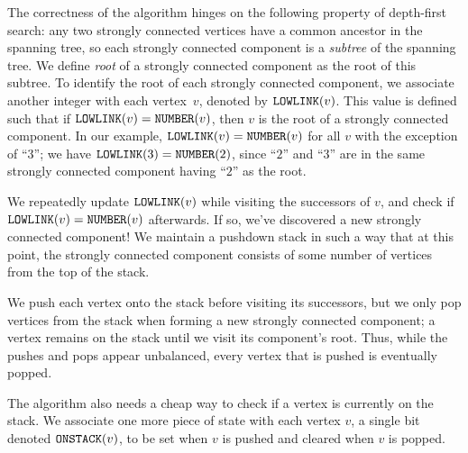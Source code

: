 \documentclass[../generics]{subfiles}
\begin{document}
The correctness of the algorithm hinges on the following property of depth-first search: any two strongly connected vertices have a common ancestor in the spanning tree, so each strongly connected component is a \emph{subtree} of the spanning tree. We define \emph{root} of a strongly connected component as the root of this subtree. To identify the root of each strongly connected component, we associate another integer with each vertex~$v$, denoted by $\texttt{LOWLINK}(v)$. This value is defined such that if $\texttt{LOWLINK}(v)=\texttt{NUMBER}(v)$, then $v$ is the root of a strongly connected component. In our example, $\texttt{LOWLINK}(v)=\texttt{NUMBER}(v)$ for all $v$ with the exception of ``$3$''; we have $\texttt{LOWLINK}(3)=\texttt{NUMBER}(2)$, since ``$2$'' and ``$3$'' are in the same strongly connected component having ``$2$'' as the root.

We repeatedly update $\texttt{LOWLINK}(v)$ while visiting the successors of $v$, and check if $\texttt{LOWLINK}(v)=\texttt{NUMBER}(v)$ afterwards. If so, we've discovered a new strongly connected component! We maintain a pushdown stack in such a way that at this point, the strongly connected component consists of some number of vertices from the top of the stack.

We push each vertex onto the stack before visiting its successors, but we only pop vertices from the stack when forming a new strongly connected component; a vertex remains on the stack until we visit its component's root. Thus, while the pushes and pops appear unbalanced, every vertex that is pushed is eventually popped.

The algorithm also needs a cheap way to check if a vertex is currently on the stack. We associate one more piece of state with each vertex $v$, a single bit denoted $\texttt{ONSTACK}(v)$, to be set when $v$ is pushed and cleared when $v$ is popped.
\end{document}
